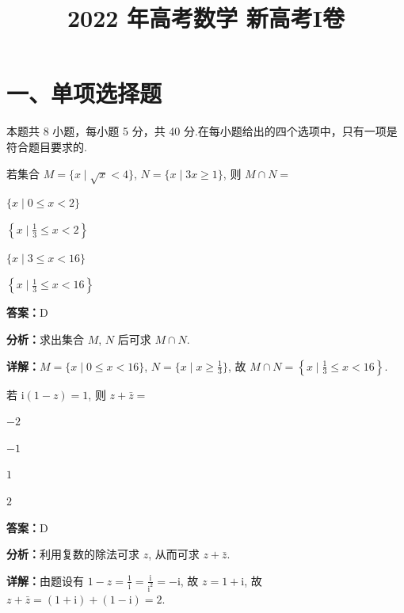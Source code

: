 ﻿\title{2022 年高考数学 新高考I卷}
\date{}
\maketitle

\section*{一、单项选择题}
本题共 8 小题，每小题 5 分，共 40 分.在每小题给出的四个选项中，只有一项是符合题目要求的.

\begin{question}[points=5]
若集合 $M = \{x\mid \sqrt{x} < 4\}$, $N = \{x\mid 3x \ge 1\}$, 则 $M \cap N =$
\begin{choices}
  \item $\{x\mid 0 \le x < 2\}$
  \item $\left\{x \mid \frac{1}{3} \le x < 2\right\}$
  \item $\{x\mid 3 \le x < 16\}$
  \item $\left\{x \mid \frac{1}{3} \le x < 16\right\}$
\end{choices}
\begin{solution}
\textbf{答案：}D

\textbf{分析：}求出集合 $M$, $N$ 后可求 $M \cap N$.

\textbf{详解：}$M = \{x\mid 0 \le x < 16\}$, $N = \{x\mid x \ge \frac{1}{3}\}$, 故 $M \cap N = \left\{x \mid \frac{1}{3} \le x < 16\right\}$.
\end{solution}
\end{question}

\begin{question}[points=5]
若 $\mathrm{i}(1 - z) = 1$, 则 $z + \bar{z} =$
\begin{choices}
  \item $-2$
  \item $-1$
  \item $1$
  \item $2$
\end{choices}
\begin{solution}
\textbf{答案：}D

\textbf{分析：}利用复数的除法可求 $z$, 从而可求 $z + \bar{z}$.

\textbf{详解：}由题设有 $1 - z = \frac{1}{\mathrm{i}} = \frac{\mathrm{i}}{\mathrm{i}^2} = -\mathrm{i}$, 故 $z = 1 + \mathrm{i}$, 故 $z + \bar{z} = (1 + \mathrm{i}) + (1 - \mathrm{i}) = 2$.
\end{solution}
\end{question}

